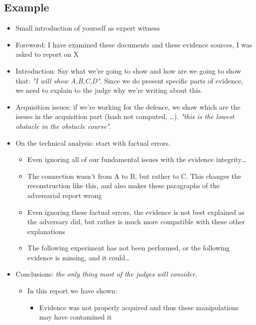         \subsection{Example}
            \begin{itemize}
                \item Small introduction of yourself as expert witness
                \item Foreword: I have examined these documents and these evidence sources, I was asked to report on X
                \item Introduction: Say what we're going to show and how are we going to show that: \textit{"I will show A,B,C,D"}. Since we do present specific parts of evidence, we need to explain to the judge why we're writing about this.
                \item Acquisition issues: if we're working for the defence, we show which are the issues in the acquisition part (hash not computed, \dots). \textit{"this is the lowest obstacle in the obstacle course"}.
                \item On the technical analysis: start with factual errors.
                \begin{itemize}
                    \item Even ignoring all of our fundamental issues with the evidence integrity\dots
                    \item The connection wasn't from A to B, but rather to C. This changes the reconstruction like this, and also makes these paragraphs of the adversarial report wrong
                    \item Even ignoring these factual errors, the evidence is not best explained as the adversary did, but rather is much more compatible with these other explanations
                    \item The following experiment has not been performed, or the following evidence is missing, and it could\dots
                \end{itemize}
                \item Conclusions: \textit{the only thing most of the judges will consider.}
                \begin{itemize}
                    \item In this report we have shown:
                    \begin{itemize}
                        \item Evidence was not properly acquired and thus these manipulations may have contamined it

\end{itemize}
\end{itemize}
\end{itemize}
